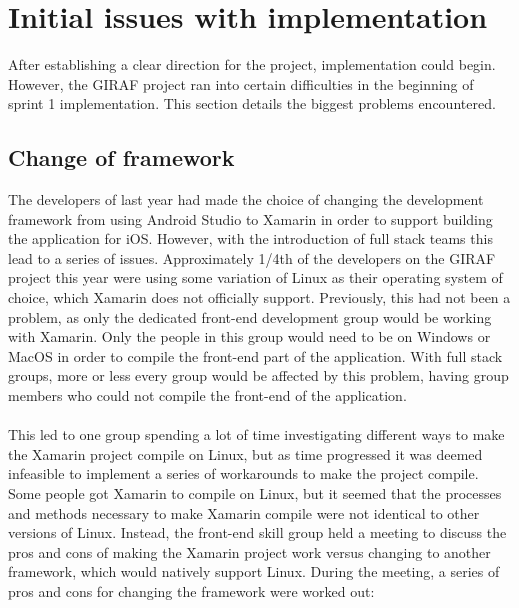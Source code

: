 \section{Initial issues with implementation}
After establishing a clear direction for the project, implementation could begin.
However, the GIRAF project ran into certain difficulties in the beginning of sprint 1 implementation.
This section details the biggest problems encountered.

\subsection{Change of framework}\label{change-of-framework}
The developers of last year had made the choice of changing the development framework from using Android Studio to Xamarin in order to support building the application for iOS.
However, with the introduction of full stack teams this lead to a series of issues. Approximately 1/4th of the developers on the GIRAF project this year were using some variation of Linux as their operating system of choice, which Xamarin does not officially support.
Previously, this had not been a problem, as only the dedicated front-end development group would be working with Xamarin. 
Only the people in this group would need to be on Windows or MacOS in order to compile the front-end part of the application.
With full stack groups, more or less every group would be affected by this problem, having group members who could not compile the front-end of the application.
\\\\
This led to one group spending a lot of time investigating different ways to make the Xamarin project compile on Linux, but as time progressed it was deemed infeasible to implement a series of workarounds to make the project compile.
Some people got Xamarin to compile on Linux, but it seemed that the processes and methods necessary to make Xamarin compile were not identical to other versions of Linux.
Instead, the front-end skill group held a meeting to discuss the pros and cons of making the Xamarin project work versus changing to another framework, which would natively support Linux.
During the meeting, a series of pros and cons for changing the framework were worked out:

